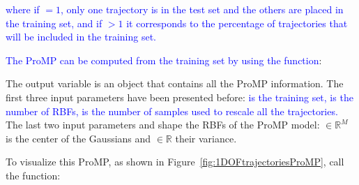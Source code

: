 \documentclass[utf8]{frontiersSCNS} %
\newcommand{\rev}[1]{\textcolor{blue}{#1}}
\newcommand{\todo}[1]{\textcolor{red}{\textbf{/*#1*/}}}
\begin{document}
\rev{where if $=1$, only one trajectory is in the test set and the others are placed in the training set, and if \mcode{partitionType}$ >1$ it corresponds to the percentage of trajectories that will be included in the training set.} 

\rev{The ProMP can be computed from the training set by using the function}:


The output variable  is an object that contains all the ProMP information. 
The first three input parameters have been presented before: \rev{ is the training set,  is the number of RBFs, \mcode{s_ref} is the number of samples used to rescale all the trajectories.}
The last two input parameters  and  shape the RBFs of the ProMP model:  $\in \mathbb{R}^M$ is the center of the Gaussians and  $\in \mathbb{R}$ their variance. 

To visualize this ProMP, as shown in Figure~\ref{fig:1DOFtrajectoriesProMP}, call the function:
\end{document}
